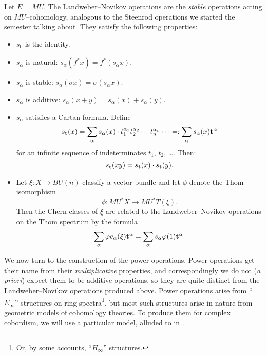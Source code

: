 \begin{remark}
Let $E = MU$.  The Landweber--Novikov operations are the \emph{stable} operations acting on $MU$--cohomology, analogous to the Steenrod operations we started the semester talking about.  They satisfy the following properties:
\begin{itemize}
\item $s_0$ is the identity.
\item $s_\alpha$ is natural: $s_\alpha(f^* x) = f^*(s_\alpha x)$.
\item $s_\alpha$ is stable: $s_\alpha(\sigma x) = \sigma(s_\alpha x)$.
\item $s_\alpha$ is additive: $s_\alpha(x + y) = s_\alpha(x) + s_\alpha(y)$.
\item $s_\alpha$ satisfies a Cartan formula.  Define \[s_{\mathbf t}(x) = \sum_\alpha s_\alpha(x) \cdot t_1^{\alpha_1} t_2^{\alpha_2} \cdots t_n^{\alpha_n} \cdots =: \sum_{\alpha} s_\alpha(x) \mathbf t^\alpha\] for an infinite sequence of indeterminates $t_1$, $t_2$, \ldots.  Then: \[s_{\mathbf t}(x y) = s_{\mathbf t}(x) \cdot s_{\mathbf t}(y).\]
\item Let $\xi: X \to BU(n)$ classify a vector bundle and let $\phi$ denote the Thom isomorphism \[\phi: MU^* X \to MU^* T(\xi).\]  Then the Chern classes of $\xi$ are related to the Landweber--Novikov operations on the Thom spectrum by the formula \[\sum_\alpha \varphi c_\alpha(\xi) \mathbf t^\alpha = \sum_\alpha s_\alpha \varphi(1) \mathbf t^\alpha.\]
\end{itemize}
\end{remark}

We now turn to the construction of the power operations.  Power operations get their name from their \emph{multiplicative} properties, and correspondingly we do not (\textit{a priori}) expect them to be additive operations, so they are quite distinct from the Landweber--Novikov operations produced above.  Power operations arise from ``$E_\infty$'' structures on ring spectra\footnote{Or, by some accounts, ``$H_\infty$'' structures.}, but most such structures arise in nature from geometric models of cohomology theories.  To produce them for complex cobordism, we will use a particular model, alluded to in .

